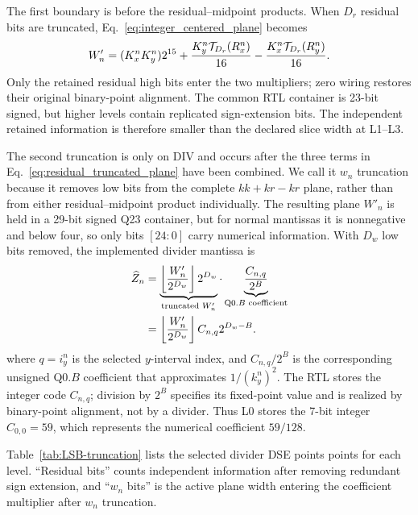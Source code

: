 \documentclass[conference]{IEEEtran}
\begin{document}
The first boundary is before the residual--midpoint products. When $D_r$
residual bits are truncated, Eq.~\eqref{eq:integer_centered_plane} becomes
\begin{equation}
 W'_n=(K_x^nK_y^n)2^{15}
 +{K_y^n\mathcal{T}_{D_r}(R_x^n)\over16}
 -{K_x^n\mathcal{T}_{D_r}(R_y^n)\over16}.
 \label{eq:residual_truncated_plane}
\end{equation}
Only the retained residual high bits enter the two multipliers; zero wiring
restores their original binary-point alignment. The common RTL container is
23-bit signed, but higher levels contain replicated sign-extension bits. The
independent retained information is therefore smaller than the declared slice
width at L1--L3.

The second truncation is only on DIV and occurs after the three terms in
Eq.~\eqref{eq:residual_truncated_plane} have been combined. We call it $w_n$ truncation because it removes low bits from the complete $kk+kr-kr$ plane,
rather than from either residual--midpoint product individually. The resulting
plane $W'_n$ is held in a 29-bit signed Q23 container, but for normal mantissas
it is nonnegative and below four, so only bits $[24:0]$ carry numerical
information. With $D_w$ low bits removed, the implemented divider mantissa is
\begin{equation}
 \begin{aligned}
 \widehat Z_n
 &=\underbrace{
 \left\lfloor{W'_n\over2^{D_w}}\right\rfloor 2^{D_w}
 }_{\text{truncated }W'_n}
 \cdot
 \underbrace{{C_{n,q}\over2^B}}_{\text{Q0.$B$ coefficient}}\\
 &=\left\lfloor{W'_n\over2^{D_w}}\right\rfloor
 C_{n,q}2^{D_w-B}.
 \end{aligned}
 \label{eq:wn_operand_truncation}
\end{equation}
where $q=i_y^n$ is the selected $y$-interval index, and $C_{n,q}/2^B$ is the
corresponding unsigned Q0.$B$ coefficient that approximates
$1/(k_y^n)^2$. The RTL stores the integer code $C_{n,q}$; division by $2^B$
specifies its fixed-point value and is realized by binary-point alignment, not
by a divider. Thus L0 stores the 7-bit integer $C_{0,0}=59$, which represents
the numerical coefficient $59/128$.

Table~\ref{tab:LSB-truncation} lists the selected divider DSE points
points for each level. ``Residual bits'' counts independent information after removing
redundant sign extension, and ``$w_n$ bits'' is the active plane width entering
the coefficient multiplier after $w_n$ truncation.
\end{document}
